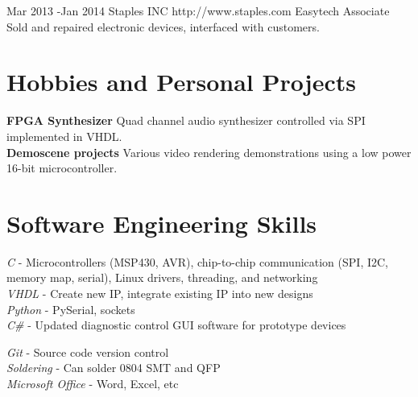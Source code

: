 \documentclass[10pt]{article} %
\begin{document}

\job
{Mar 2013 -}{Jan 2014}
{Staples INC}
{http://www.staples.com}
{Easytech Associate}
{Sold and repaired electronic devices, interfaced with customers.}


\section {Hobbies and Personal Projects}

\textbf{FPGA Synthesizer} Quad channel audio synthesizer controlled via SPI implemented in VHDL.\\
\smallskip
\textbf{Demoscene projects} Various video rendering demonstrations using a low power 16-bit microcontroller.




\section{Software Engineering Skills}

{
  \textit{C} - Microcontrollers (MSP430, AVR), chip-to-chip communication (SPI, I2C, memory map, serial), Linux drivers, threading, and networking\\
\textit{VHDL} - Create new IP, integrate existing IP into new designs\\
\textit{Python} - PySerial, sockets\\
\textit{C\#} - Updated diagnostic control GUI software for prototype devices
}


{
\textit{Git} - Source code version control\\
\textit{Soldering} - Can solder 0804 SMT and QFP\\
\textit{Microsoft Office} - Word, Excel, etc
}
\end{document}
